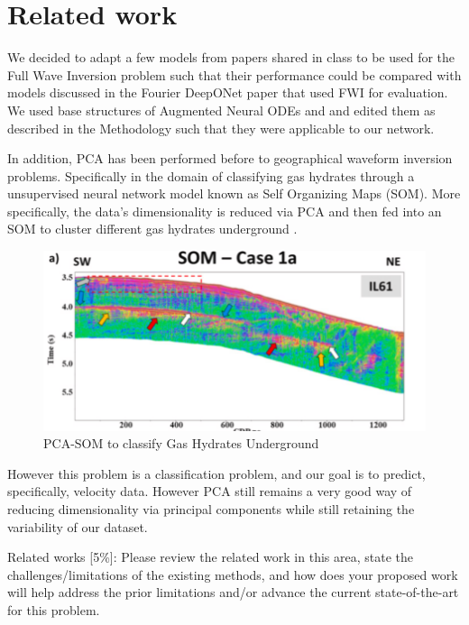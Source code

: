 \documentclass{article}
\newcommand{\instructions}[1]{{\color{blue} #1}}
\begin{document}
\section{Related work} 

    We decided to adapt a few models from papers shared in class to be used for the Full Wave Inversion problem such that their performance could be compared with models discussed in the Fourier DeepONet paper \cite{fdonet} that used FWI for evaluation. We used base structures of Augmented Neural ODEs \cite{anode} and \cite{fno} and edited them as described in the Methodology such that they were applicable to our network.

    In addition, PCA has been performed before to geographical waveform inversion problems. Specifically in the domain of classifying gas hydrates through a unsupervised neural network model known as Self Organizing Maps (SOM). More specifically, the data's dimensionality is reduced via PCA and then fed into an SOM to cluster different gas hydrates underground \cite{jones2023waveform}.  

    \begin{figure}[H]
        \centering
        \includegraphics[width=0.5\linewidth]{figures/related1.png}
        \caption{PCA-SOM to classify Gas Hydrates Underground}
        \label{fig:related1}
    \end{figure}
    
    However this problem is a classification problem, and our goal is to predict, specifically, velocity data. However PCA still remains a very good way of reducing dimensionality via principal components while still retaining the variability of our dataset.


\instructions{Related works [5\%]: Please review the related work in this area, state the challenges/limitations of the existing methods, and how does your proposed work will help address the prior limitations and/or advance the current state-of-the-art for this problem.}
\end{document}
